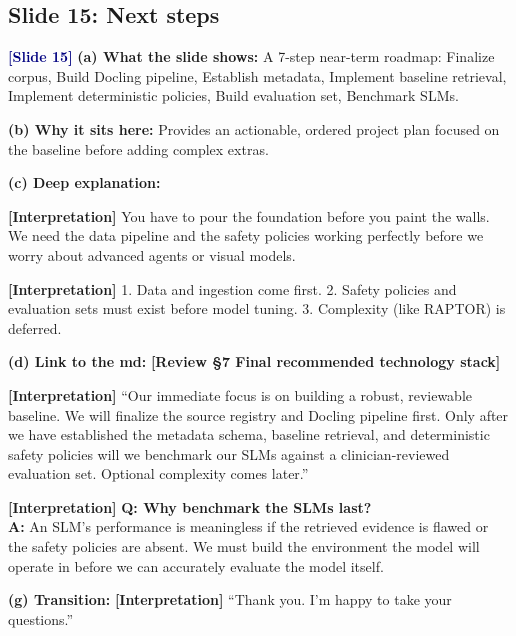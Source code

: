 \documentclass[11pt,a4paper]{article}
\newcommand{\origintag}[2]{\textcolor{#1}{\small\textbf{[#2]}}}
\begin{document}
\subsection{Slide 15: Next steps}
\origintag{navy}{Slide 15}
\textbf{(a) What the slide shows:} A 7-step near-term roadmap: Finalize corpus, Build Docling pipeline, Establish metadata, Implement baseline retrieval, Implement deterministic policies, Build evaluation set, Benchmark SLMs.

\textbf{(b) Why it sits here:} Provides an actionable, ordered project plan focused on the baseline before adding complex extras.

\textbf{(c) Deep explanation:}
\begin{analogy}
\origintag{slate}{Interpretation} You have to pour the foundation before you paint the walls. We need the data pipeline and the safety policies working perfectly before we worry about advanced agents or visual models.
\end{analogy}
\origintag{slate}{Interpretation} 1. Data and ingestion come first. 2. Safety policies and evaluation sets must exist before model tuning. 3. Complexity (like RAPTOR) is deferred.

\textbf{(d) Link to the md:} \origintag{amber}{Review \S7 Final recommended technology stack}

\begin{sayit}
\origintag{slate}{Interpretation} ``Our immediate focus is on building a robust, reviewable baseline. We will finalize the source registry and Docling pipeline first. Only after we have established the metadata schema, baseline retrieval, and deterministic safety policies will we benchmark our SLMs against a clinician-reviewed evaluation set. Optional complexity comes later.''
\end{sayit}

\begin{qa}
\origintag{slate}{Interpretation} \textbf{Q: Why benchmark the SLMs last?} \\
\textbf{A:} An SLM's performance is meaningless if the retrieved evidence is flawed or the safety policies are absent. We must build the environment the model will operate in before we can accurately evaluate the model itself.
\end{qa}
\textbf{(g) Transition:} \origintag{slate}{Interpretation} ``Thank you. I'm happy to take your questions.''

\end{document}

